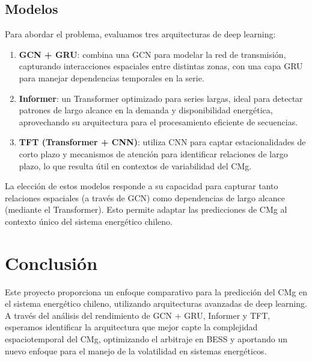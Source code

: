 \documentclass[11pt, twocolumn]{article}
\begin{document}
\subsection{Modelos}
Para abordar el problema, evaluamos tres arquitecturas de deep learning:

\begin{enumerate}
    \item \textbf{GCN + GRU}: combina una GCN para modelar la red de transmisión, capturando interacciones espaciales entre distintas zonas, con una capa GRU para manejar dependencias temporales en la serie.
    \item \textbf{Informer}: un Transformer optimizado para series largas, ideal para detectar patrones de largo alcance en la demanda y disponibilidad energética, aprovechando su arquitectura para el procesamiento eficiente de secuencias.
    \item \textbf{TFT (Transformer + CNN)}: utiliza CNN para captar estacionalidades de corto plazo y mecanismos de atención para identificar relaciones de largo plazo, lo que resulta útil en contextos de variabilidad del CMg.
\end{enumerate}

La elección de estos modelos responde a su capacidad para capturar tanto relaciones espaciales (a través de GCN) como dependencias de largo alcance (mediante el Transformer). Esto permite adaptar las predicciones de CMg al contexto único del sistema energético chileno.

\section{Conclusión}
Este proyecto proporciona un enfoque comparativo para la predicción del CMg en el sistema energético chileno, utilizando arquitecturas avanzadas de deep learning. A través del análisis del rendimiento de GCN + GRU, Informer y TFT, esperamos identificar la arquitectura que mejor capte la complejidad espaciotemporal del CMg, optimizando el arbitraje en BESS y aportando un nuevo enfoque para el manejo de la volatilidad en sistemas energéticos.
\end{document}
